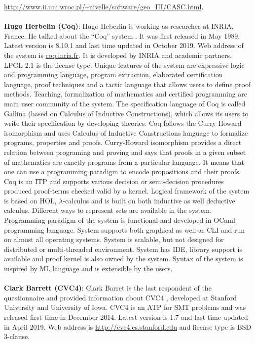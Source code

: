 \url{http://www.ii.uni.wroc.pl/~nivelle/software/geo_III/CASC.html}.
\\\\
{\bf Hugo Herbelin (Coq)}: Hugo Heberlin is working as researcher at INRIA, France. He talked about the ``Coq'' system . It was first released in May 1989. 
Latest version is 8.10.1 and last time updated in October 2019. 
Web address of the system is \url{coq.inria.fr}. It is developed by INRIA and academic partners. LPGL 2.1 is the license type. 
Unique features of the system are 
expressive logic and programming language, program extraction, elaborated certification 
language, proof techniques and a tactic language that allows users to define proof methods.
Teaching, formalization of mathematics and certified programming are main user community of the system. 
The specification language of Coq is called Gallina (based on Calculus of Inductive Constructions), 
which allows its users to write their specification by developing theories.
Coq follows the Curry-Howard isomorphism  and uses Calculus of Inductive Constructions language  to formalize programs, properties and proofs. 
Curry-Howard isomorphism provides a direct relation between programing and proving and says that proofs in a given subset of 
mathematics are exactly programs from a particular language. It means that one can use a programming paradigm to encode propositions and their proofs.
Coq is an ITP and supports various decision or semi-decision procedures produced proof-terms checked valid by a kernel. 
Logical framework of the system is based on HOL, $\lambda$-calculus and is built on both inductive as well deductive calculus. 
Different ways to represent sets are available in the system. Programming paradigm of the system is functional and developed in OCaml programming 
language. System supports both graphical as well as CLI and run on almost all operating systems. 
System is scalable, but not designed for distributed or multi-threaded environment. System has IDE, library support is available and 
proof kernel is also owned by the system. Syntax of the system is inspired by ML language and is extensible by the users.
\\\\
{\bf Clark Barrett (CVC4)}: Clark Barret is the last respondent of the questionnaire and provided information about CVC4 , developed at Stanford University and University of Iowa. 
CVC4 is an ATP for SMT problems and was released first time in December 2014. Latest version is 1.7 and last time updated in April 2019. 
Web address is \url{http://cvc4.cs.stanford.edu} and license type is BSD 3-clause.  
